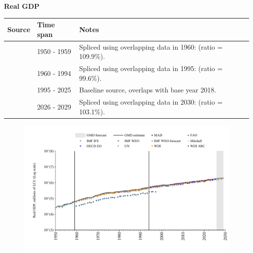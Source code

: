 \documentclass[12pt,a4paper,landscape]{article}
\begin{document}
\begin{adjustbox}{max totalsize={\paperwidth}{\paperheight},center}
\begin{minipage}[t][\textheight][t]{\textwidth}
\vspace*{0.5cm}
{}
\begin{center}
{\Large\bfseries Real GDP}
\end{center}
\vspace{0.5cm}
\begin{table}[H]
\centering
\small
\begin{tabular}{|l|l|l|}
\hline
\textbf{Source} & \textbf{Time span} & \textbf{Notes} \\
\hline
\rowcolor{white}\cite{Mitchell}& 1950 - 1959 &Spliced using overlapping data in 1960: (ratio = 109.9\%). \\
\rowcolor{lightgray}\cite{WDI}& 1960 - 1994 &Spliced using overlapping data in 1995: (ratio = 99.6\%). \\
\rowcolor{white}\cite{OECD_EO}& 1995 - 2025 &Baseline source, overlaps with base year 2018. \\
\rowcolor{lightgray}\cite{IMF_WEO_forecast}& 2026 - 2029 &Spliced using overlapping data in 2030: (ratio = 103.1\%). \\
\hline
\end{tabular}
\end{table}
\begin{figure}[H]
\centering
\includegraphics[width=\textwidth,height=0.6\textheight,keepaspectratio]{graphs/ISR_rGDP.pdf}
\end{figure}
\end{minipage}
\end{adjustbox}
\end{document}
